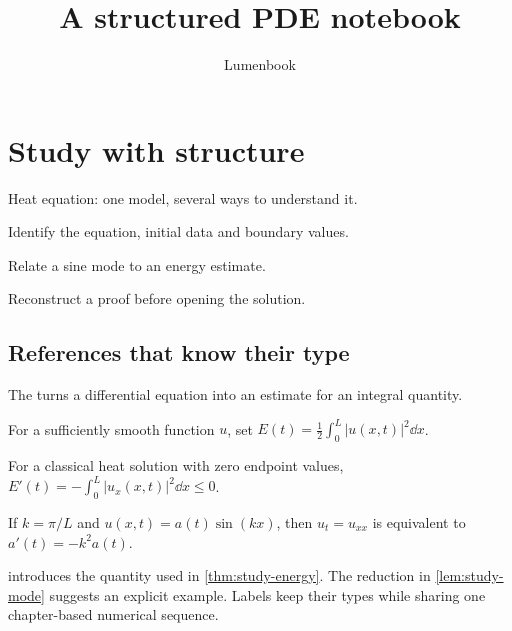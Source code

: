 \expandafter\documentclass\expandafter[\StudyOptions]{lumenbook}
\title{A structured PDE notebook}
\author{Lumenbook}
\begin{document}
\chapter{Study with structure}
  {Heat equation: one model, several ways to understand it.}
\begin{learningobjectives}
  \item Identify the equation, initial data and boundary values.
  \item Relate a sine mode to an energy estimate.
  \item Reconstruct a proof before opening the solution.
\end{learningobjectives}
\section{References that know their type}
The  turns a differential equation into
an estimate for an integral quantity.
\begin{definition}[Energy]\label{def:study-energy}
For a sufficiently smooth function $u$, set
$E(t)=\frac12\int_0^L |u(x,t)|^2\dd x$.
\end{definition}
\begin{theorem}[Dissipation]\label{thm:study-energy}
For a classical heat solution with zero endpoint values,
$E'(t)=-\int_0^L|u_x(x,t)|^2\dd x\leq 0$.
\end{theorem}
\begin{lemma}\label{lem:study-mode}
If $k=\pi/L$ and $u(x,t)=a(t)\sin(kx)$, then $u_t=u_{xx}$
is equivalent to $a'(t)=-k^2a(t)$.
\end{lemma}
 introduces the quantity used in
\cref{thm:study-energy}. The reduction in \cref{lem:study-mode}
suggests an explicit example. Labels keep their types while sharing
one chapter-based numerical sequence.

\newpage
\end{document}
